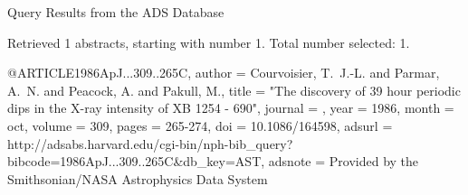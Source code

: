 Query Results from the ADS Database


Retrieved 1 abstracts, starting with number 1.  Total number selected: 1.

@ARTICLE{1986ApJ...309..265C,
   author = {{Courvoisier}, T.~J.-L. and {Parmar}, A.~N. and {Peacock}, A. and 
	{Pakull}, M.},
    title = "{The discovery of 39 hour periodic dips in the X-ray intensity of XB 1254 - 690}",
  journal = {\apj},
     year = 1986,
    month = oct,
   volume = 309,
    pages = {265-274},
      doi = {10.1086/164598},
   adsurl = {http://adsabs.harvard.edu/cgi-bin/nph-bib_query?bibcode=1986ApJ...309..265C&db_key=AST},
  adsnote = {Provided by the Smithsonian/NASA Astrophysics Data System}
}


